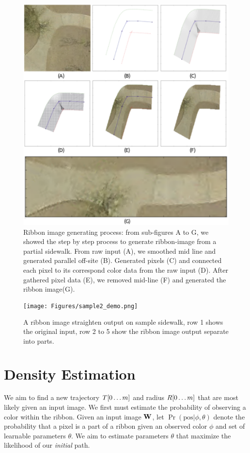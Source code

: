 \begin{figure}[H]
    \centering
    \includegraphics[width=\textwidth]{Figures/straghten.pdf}
    \caption[Ribbon Image Generation]{Ribbon image generating process: from sub-figures A to G, we showed the step by step process to generate ribbon-image from a partial sidewalk. From raw input (A), we smoothed mid line and generated parallel off-site (B). Generated pixels (C) and connected each pixel to its correspond color data from the raw input (D). After gathered pixel data (E), we removed mid-line (F) and generated the ribbon image(G).}
    \label{fig:StraightenProcess}
\end{figure}

\begin{figure}
    \centering
    \texttt{[image: Figures/sample2\_demo.png]}
    \caption[Sample Sidewalk 2]{A ribbon image straighten output on sample sidewalk, row 1 shows the original input, row 2 to 5 show the ribbon image output separate into parts.}
    \label{fig:Sample_Sidewalk_2}
\end{figure}

\section{Density Estimation}
We aim to find a new trajectory $T{[0\dots m]}$ and radius $R{[0\dots m]}$ that are most likely given an input image. We first must estimate the probability of observing a color within the ribbon.  
Given an input image $\mathbf{W}{}$, let $\Pr(\text{pos}|\phi,\theta)$ denote the probability that a pixel is a part of a ribbon given an observed color $\phi$ and set of learnable parameters $\theta$. 
We aim to estimate parameters $\theta$ that maximize the likelihood of our \textit{initial} path. 

